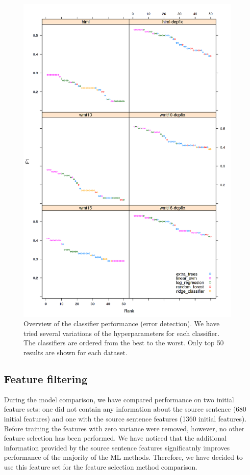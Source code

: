 \begin{figure}
\centering
  \includegraphics[scale=0.7]{wf-class}
  \caption{
    Overview of the classifier performance (error detection).
We have tried several variations of the hyperparameters
for each classifier. The classifiers are ordered from the best to the worst. Only top 50 results
are shown for each dataset.
}
  \label{wf-draft}
\end{figure}

\subsection{Feature filtering}

During the model comparison, we have compared performance on two initial feature sets:
one did not contain any information about the source sentence (\tilda{}680 initial features)
and one with the source sentence features (\tilda{}1360 initial features). Before training
the features with zero variance were removed, however, no other feature selection has been
performed. We have noticed that the additional information provided by the source sentence features
significatnly improves performance of the majority of the ML methods. Therefore, we have decided
to use this feature set for the feature selection method comparison.

